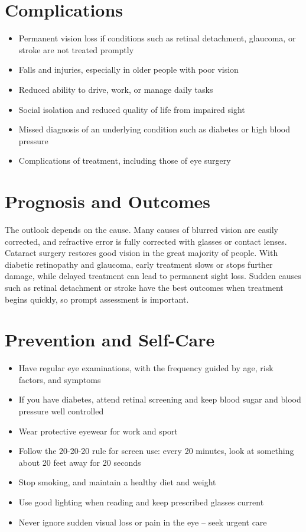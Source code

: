 \section*{Complications}
\begin{itemize}
    \item Permanent vision loss if conditions such as retinal detachment, glaucoma, or stroke are not treated promptly
    \item Falls and injuries, especially in older people with poor vision
    \item Reduced ability to drive, work, or manage daily tasks
    \item Social isolation and reduced quality of life from impaired sight
    \item Missed diagnosis of an underlying condition such as diabetes or high blood pressure
    \item Complications of treatment, including those of eye surgery
\end{itemize}

\section*{Prognosis and Outcomes}
The outlook depends on the cause. Many causes of blurred vision are easily corrected, and refractive error is fully corrected with glasses or contact lenses. Cataract surgery restores good vision in the great majority of people. With diabetic retinopathy and glaucoma, early treatment slows or stops further damage, while delayed treatment can lead to permanent sight loss. Sudden causes such as retinal detachment or stroke have the best outcomes when treatment begins quickly, so prompt assessment is important.

\section*{Prevention and Self-Care}
\begin{itemize}
    \item Have regular eye examinations, with the frequency guided by age, risk factors, and symptoms
    \item If you have diabetes, attend retinal screening and keep blood sugar and blood pressure well controlled
    \item Wear protective eyewear for work and sport
    \item Follow the 20-20-20 rule for screen use: every 20 minutes, look at something about 20 feet away for 20 seconds
    \item Stop smoking, and maintain a healthy diet and weight
    \item Use good lighting when reading and keep prescribed glasses current
    \item Never ignore sudden visual loss or pain in the eye -- seek urgent care
\end{itemize}

